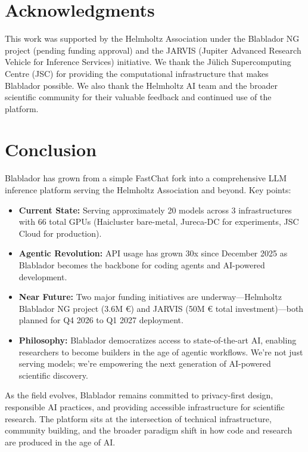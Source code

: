 \documentclass[10pt,conference]{IEEEtran}
\begin{document}
\section*{Acknowledgments}

This work was supported by the Helmholtz Association under the Blablador NG project (pending funding approval) and the JARVIS (Jupiter Advanced Research Vehicle for Inference Services) initiative. We thank the Jülich Supercomputing Centre (JSC) for providing the computational infrastructure that makes Blablador possible. We also thank the Helmholtz AI team and the broader scientific community for their valuable feedback and continued use of the platform.

\section{Conclusion}
Blablador has grown from a simple FastChat fork into a comprehensive LLM inference platform serving the Helmholtz Association and beyond. Key points:

\begin{itemize}
    \item \textbf{Current State:} Serving approximately 20 models across 3 infrastructures with 66 total GPUs (Haicluster bare-metal, Jureca-DC for experiments, JSC Cloud for production).
    
    \item \textbf{Agentic Revolution:} API usage has grown 30x since December 2025 as Blablador becomes the backbone for coding agents and AI-powered development.
    
    \item \textbf{Near Future:} Two major funding initiatives are underway—Helmholtz Blablador NG project (3.6M €) and JARVIS (50M € total investment)—both planned for Q4 2026 to Q1 2027 deployment.
    
    \item \textbf{Philosophy:} Blablador democratizes access to state-of-the-art AI, enabling researchers to become builders in the age of agentic workflows. We're not just serving models; we're empowering the next generation of AI-powered scientific discovery.
\end{itemize}

As the field evolves, Blablador remains committed to privacy-first design, responsible AI practices, and providing accessible infrastructure for scientific research. The platform sits at the intersection of technical infrastructure, community building, and the broader paradigm shift in how code and research are produced in the age of AI.



\end{document}
